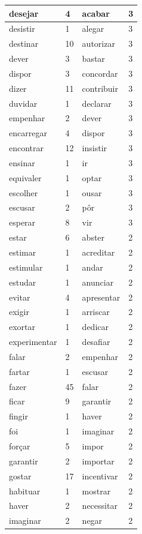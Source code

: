 \documentclass[output=paper,colorlinks,citecolor=brown]{langscibook}
\begin{document}
\begin{longtable}{ p{3cm} | p{1cm} | p{3cm} | p{1cm} }
		desejar & 4 & acabar & 3\\\hline
		desistir & 1 & alegar & 3\\\hline
		destinar & 10 & autorizar & 3\\\hline
		dever & 3 & bastar & 3\\\hline
		dispor & 3 & concordar & 3\\\hline
		dizer & 11 & contribuir & 3\\\hline
		duvidar & 1 & declarar & 3\\\hline
		empenhar & 2 & dever & 3\\\hline
		encarregar & 4 & dispor & 3\\\hline
		encontrar & 12 & insistir & 3\\\hline
		ensinar & 1 & ir & 3\\\hline
		equivaler & 1 & optar & 3\\\hline
		escolher & 1 & ousar & 3\\\hline
		escusar & 2 & pôr & 3\\\hline
		esperar & 8 & vir & 3\\\hline
		estar & 6 & abster & 2\\\hline
		estimar & 1 & acreditar & 2\\\hline
		estimular & 1 & andar & 2\\\hline
		estudar & 1 & anunciar & 2\\\hline
		evitar & 4 & apresentar & 2\\\hline
		exigir & 1 & arriscar & 2\\\hline
		exortar & 1 & dedicar & 2\\\hline
		experimentar & 1 & desafiar & 2\\\hline
		falar & 2 & empenhar & 2\\\hline
		fartar & 1 & escusar & 2\\\hline
		fazer & 45 & falar & 2\\\hline
		ficar & 9 & garantir & 2\\\hline
		fingir & 1 & haver & 2\\\hline
		foi & 1 & imaginar & 2\\\hline
		forçar & 5 & impor & 2\\\hline
		garantir & 2 & importar & 2\\\hline
		gostar & 17 & incentivar & 2\\\hline
		habituar & 1 & mostrar & 2\\\hline
		haver & 2 & necessitar & 2\\\hline
		imaginar & 2 & negar & 2\\\hline

\end{longtable}
\end{document}
